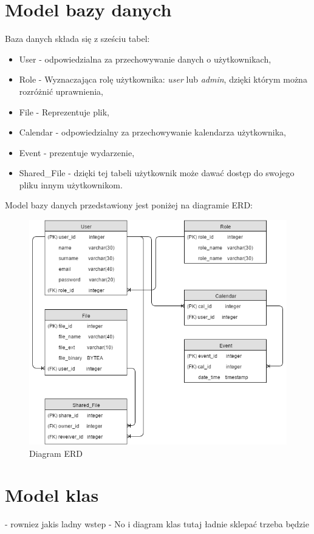 \section{Model bazy danych}
Baza danych składa się z sześciu tabel:
\begin{itemize}
	\item User - odpowiedzialna za przechowywanie danych o użytkownikach,
	\item Role - Wyznaczająca rolę użytkownika: \textit{user} lub \textit{admin}, dzięki którym można rozróżnić uprawnienia,
	\item File - Reprezentuje plik,
	\item Calendar - odpowiedzialny za przechowywanie kalendarza użytkownika,
	\item Event - prezentuje wydarzenie,
	\item Shared\_File - dzięki tej tabeli użytkownik może dawać dostęp do swojego pliku innym użytkownikom.
\end{itemize}
Model bazy danych przedstawiony jest poniżej na diagramie ERD:
\begin{figure}[H]
\centering
\includegraphics[scale=0.5]{ERD}
\caption{\label{fig:diag_02}Diagram ERD}
\end{figure}

\section{Model klas}
- rowniez jakis ladny wstep \newline
- No i diagram klas tutaj ładnie sklepać trzeba będzie \newline

